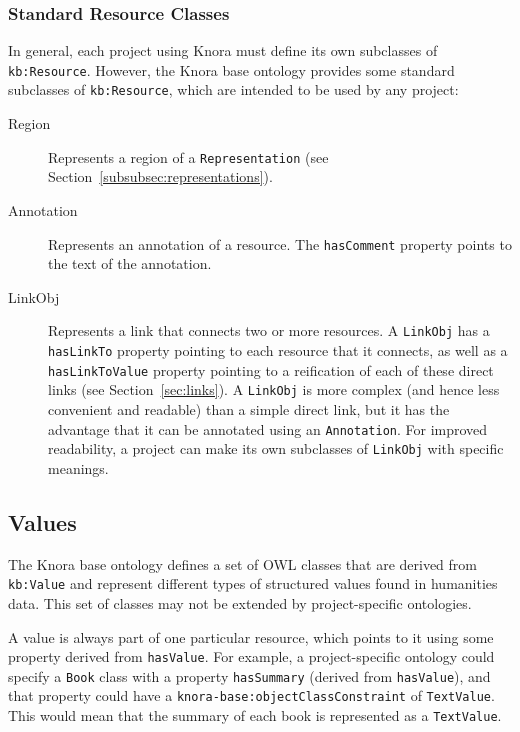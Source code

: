 \documentclass[12pt, a4paper]{article}
\begin{document}
\subsubsection{Standard Resource Classes}

In general, each project using Knora must define its own subclasses of \texttt{kb:Resource}. However, the Knora base ontology provides some standard subclasses of \texttt{kb:Resource}, which are intended to be used by any project:

\begin{description}
	\item[Region] Represents a region of a \texttt{Representation} (see Section~\ref{subsubsec:representations}).
	\item[Annotation] Represents an annotation of a resource. The \texttt{hasComment} property points to the text of the annotation.
	\item[LinkObj] Represents a link that connects two or more resources. A \texttt{LinkObj} has a \texttt{hasLinkTo} property pointing to each resource that it connects, as well as a \texttt{hasLinkToValue} property pointing to a reification of each of these direct links (see Section~\ref{sec:links}). A \texttt{LinkObj} is more complex (and hence less convenient and readable) than a simple direct link, but it has the advantage that it can be annotated using an \texttt{Annotation}. For improved readability, a project can make its own subclasses of \texttt{LinkObj} with specific meanings.
\end{description}

\subsection{Values}

\label{subsec:values}

The Knora base ontology defines a set of OWL classes that are derived from \texttt{kb:Value} and represent different types of structured values found in humanities data. This set of classes may not be extended by project-specific ontologies.

A value is always part of one particular resource, which points to it using some property derived from \texttt{hasValue}. For example, a project-specific ontology could specify a \texttt{Book} class with a property \texttt{hasSummary} (derived from \texttt{hasValue}), and that property could have a \texttt{knora-base:object\-Class\-Constraint} of \texttt{TextValue}. This would mean that the summary of each book is represented as a \texttt{TextValue}.
\end{document}
